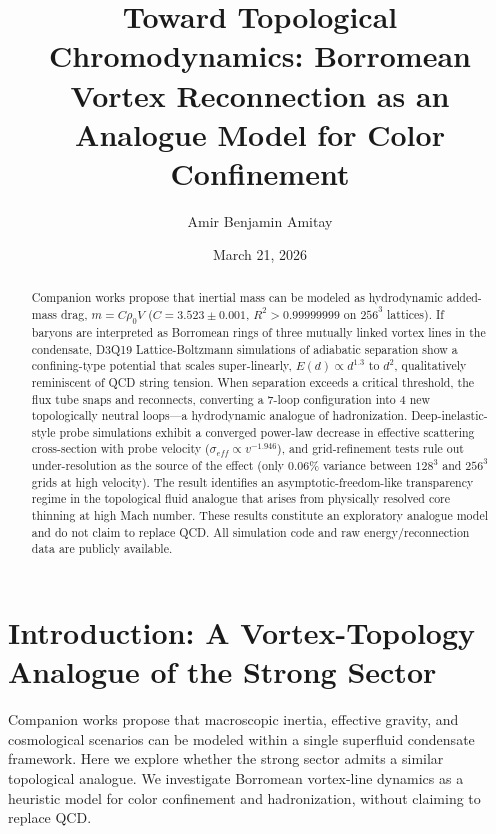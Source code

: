 \documentclass[reprint,amsmath,amssymb,aps,prl,superscriptaddress]{revtex4-2}
\begin{document}
\title{Toward Topological Chromodynamics: Borromean Vortex Reconnection as an Analogue Model for Color Confinement}

\author{Amir Benjamin Amitay}

\date{March 21, 2026}

\begin{abstract}
Companion works propose that inertial mass can be modeled as hydrodynamic added-mass drag, $m=C\rho_0V$ ($C=3.523\pm0.001$, $R^2>0.99999999$ on $256^3$ lattices). If baryons are interpreted as Borromean rings of three mutually linked vortex lines in the condensate, D3Q19 Lattice-Boltzmann simulations of adiabatic separation show a confining-type potential that scales super-linearly, $E(d)\propto d^{1.3}$ to $d^2$, qualitatively reminiscent of QCD string tension. When separation exceeds a critical threshold, the flux tube snaps and reconnects, converting a 7-loop configuration into 4 new topologically neutral loops---a hydrodynamic analogue of hadronization.
Deep-inelastic-style probe simulations exhibit a converged power-law decrease in effective scattering cross-section with probe velocity ($\sigma_{eff} \propto v^{-1.946}$), and grid-refinement tests rule out under-resolution as the source of the effect (only 0.06\% variance between $128^3$ and $256^3$ grids at high velocity). The result identifies an asymptotic-freedom-like transparency regime in the topological fluid analogue that arises from physically resolved core thinning at high Mach number.
These results constitute an exploratory analogue model and do not claim to replace QCD. All simulation code and raw energy/reconnection data are publicly available.
\end{abstract}

\maketitle

\section{Introduction: A Vortex-Topology Analogue of the Strong Sector}
\label{sec:intro}

Companion works propose that macroscopic inertia, effective gravity, and cosmological scenarios can be modeled within a single superfluid condensate framework. Here we explore whether the strong sector admits a similar topological analogue. We investigate Borromean vortex-line dynamics as a heuristic model for color confinement and hadronization, without claiming to replace QCD.
\end{document}

